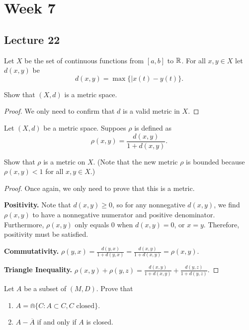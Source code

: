 \documentclass{book}
\begin{document}
\chapter{Week 7}
\section{Lecture 22}
\begin{hw}
    Let $X$ be the set of continuous functions from $[a, b]$ to $\mathbb{R}$. For all $x, y \in X$ let $d(x, y)$ be \[d(x, y) = \max \{ |x(t) - y(t) \}.\]

    Show that $(X, d)$ is a metric space.
\end{hw}

\begin{proof}
    We only need to confirm that $d$ is a valid metric in $X$.
\end{proof}

\begin{hw}
    Let $(X, d)$ be a metric space. Suppoes $\rho$ is defined as \[\rho(x, y) = \frac{d(x, y)}{1 + d(x, y)}.\] 

    Show that $\rho$ is a metric on $X$. (Note that the new metric $\rho$ is bounded because $\rho(x, y) < 1$ for all $x, y \in X$.)
\end{hw}

\begin{proof}
    Once again, we only need to prove that this is a metric.

    \textbf{Positivity.} Note that $d(x, y) \geq 0$, so for any nonnegative $d(x, y)$, we find $\rho(x, y)$ to have a nonnegative numerator and positive denominator. Furthermore, $\rho(x, y)$ only equals $0$ when $d(x, y) = 0$, or $x = y$. Therefore, positivity must be satisfied.

    \textbf{Commutativity.} $\rho(y, x) = \frac{d(y, x)}{1 + d(y, x)} = \frac{d(x, y)}{1 + d(x, y)} = \rho(x, y)$.

    \textbf{Triangle Inequality.} $\rho(x, y) + \rho(y, z) = \frac{d(x, y)}{1 + d(x, y)} + \frac{d(y, z)}{1 + d(y, z)}$.
\end{proof}

\begin{hw}
    Let $A$ be a subset of $(M, D)$. Prove that 
    \begin{enumerate}
        \item $A = \Cap\{C : A \subset C, C \text{ closed}\}$.
        \item $A - \overline A$ if and only if $A$ is closed.
    \end{enumerate}
\end{hw}
\end{document}
